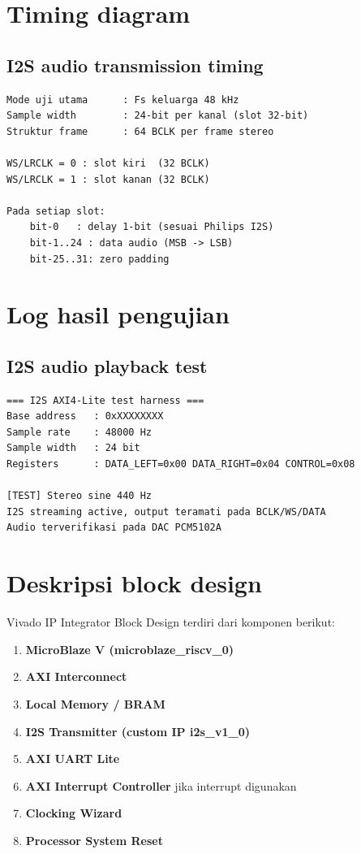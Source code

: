 \section{Timing diagram}

\subsection{I2S audio transmission timing}

\begin{verbatim}
Mode uji utama      : Fs keluarga 48 kHz
Sample width        : 24-bit per kanal (slot 32-bit)
Struktur frame      : 64 BCLK per frame stereo

WS/LRCLK = 0 : slot kiri  (32 BCLK)
WS/LRCLK = 1 : slot kanan (32 BCLK)

Pada setiap slot:
	bit-0   : delay 1-bit (sesuai Philips I2S)
	bit-1..24 : data audio (MSB -> LSB)
	bit-25..31: zero padding
\end{verbatim}

\section{Log hasil pengujian}

\subsection{I2S audio playback test}

\begin{verbatim}
=== I2S AXI4-Lite test harness ===
Base address   : 0xXXXXXXXX
Sample rate    : 48000 Hz
Sample width   : 24 bit
Registers      : DATA_LEFT=0x00 DATA_RIGHT=0x04 CONTROL=0x08

[TEST] Stereo sine 440 Hz
I2S streaming active, output teramati pada BCLK/WS/DATA
Audio terverifikasi pada DAC PCM5102A
\end{verbatim}

\section{Deskripsi block design}

Vivado IP Integrator Block Design terdiri dari komponen berikut:

\begin{enumerate}
\item \textbf{MicroBlaze V (microblaze\_riscv\_0)}
\item \textbf{AXI Interconnect}
\item \textbf{Local Memory / BRAM}
\item \textbf{I2S Transmitter (custom IP i2s\_v1\_0)}
\item \textbf{AXI UART Lite}
\item \textbf{AXI Interrupt Controller} jika interrupt digunakan
\item \textbf{Clocking Wizard}
\item \textbf{Processor System Reset}
\end{enumerate}

